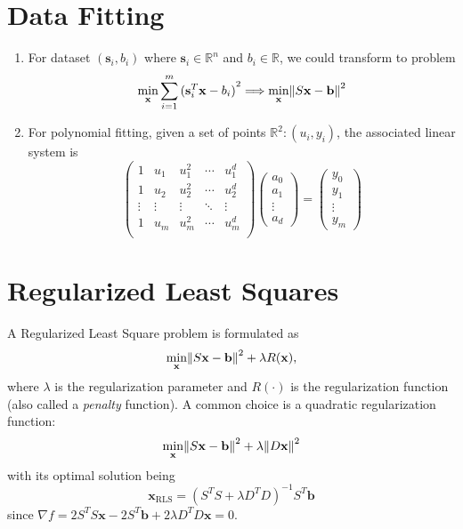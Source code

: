 \documentclass[12pt]{report}
\theoremstyle{definition}
\begin{document}
\section{Data Fitting}

\begin{enumerate}
    \item For dataset $(\mathbf{s}_i,b_i)$ where $\mathbf{s}_i\in\mathbb{R}^{n}$ 
        and $b_i\in\mathbb{R}$, we could transform to problem
        \[
            \underset{\mathbf{x}}{\text{min}}
            \sum_{i=1}^{m} {(\mathbf{s}_i^T\mathbf{x}-b_i)}^{2}
            \Longrightarrow
            \underset{\mathbf{x}}{\text{min}}
            \norm{S\mathbf{x}-\mathbf{b}}^2
        \]
    \item For polynomial fitting, given a set of points $\mathbb{R}^{2}:(u_i,y_i)$,
        the associated linear system is
        \[
            \begin{pmatrix}
                1 & u_1 & u_1^2 & \cdots & u_1^d \\
                1 & u_2 & u_2^2 & \cdots & u_2^d \\
                \vdots & \vdots & \vdots & \ddots & \vdots \\
                1 & u_m & u_m^2 & \cdots & u_m^d \\
            \end{pmatrix} 
            \begin{pmatrix}
                a_0 \\
                a_1 \\
                \vdots \\
                a_d
            \end{pmatrix} 
            =
            \begin{pmatrix}
                y_0 \\
                y_1 \\
                \vdots \\
                y_m
            \end{pmatrix} 
        \]
\end{enumerate} 

\section{Regularized Least Squares}

A Regularized Least Square problem is formulated as
\[
    \underset{\mathbf{x}}{\text{min}}
    \norm{S\mathbf{x}-\mathbf{b}}^2
    +\lambda R(\mathbf{x}),
\]
where $\lambda$ is the regularization parameter and $R(\cdot)$ is the
regularization function (also called a \emph{penalty} function).
A common choice is a quadratic regularization function:
\[
    \underset{\mathbf{x}}{\text{min}}
    \norm{S\mathbf{x}-\mathbf{b}}^2
    +\lambda \norm{D\mathbf{x}}^2
\]
with its optimal solution being
\[
    \mathbf{x}_\text{RLS}={(S^TS+\lambda D^TD)}^{-1}S^T \mathbf{b}
\]
since $\nabla f=2S^TS\mathbf{x}-2S^T \mathbf{b}+2\lambda D^TD\mathbf{x}=0$.
\end{document}
